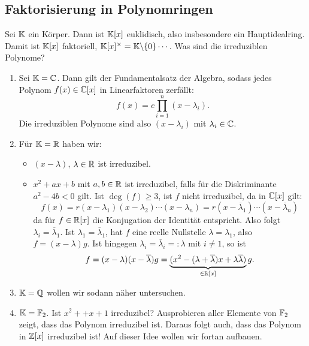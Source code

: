 \subsection{Faktorisierung in Polynomringen}
\label{sec:galois}

\begin{beispiele}
Sei $\mathbb{K}$ ein Körper. Dann ist $\mathbb{K}[x]$ euklidisch, also insbesondere ein Hauptidealring. Damit ist $\mathbb{K}[x]$ faktoriell, $\mathbb{K}[x]^\times = \mathbb{K} \backslash \{0\} \cdots$. Was sind die irreduziblen Polynome?
\begin{enumerate}
\item Sei $\mathbb{K} = \mathbb{C}$. Dann gilt der Fundamentalsatz der Algebra, sodass jedes Polynom $f(x) \in \mathbb{C}[x]$ in Linearfaktoren zerfällt:
\begin{equation}
f(x) = c \prod_{i=1}^n (x-\lambda_i).
\end{equation}
Die irreduziblen Polynome sind also $(x-\lambda_i)$ mit $\lambda_i \in \mathbb{C}$.
\item Für $\mathbb{K} = \mathbb{R}$ haben wir:
\begin{itemize}
\item $(x-\lambda)$, $\lambda \in \mathbb{R}$ ist irreduzibel.
\item $x^2+ax+b$ mit $a,b \in \mathbb{R}$ ist irreduzibel, falls für die Diskriminante $a^2-4b<0$ gilt. Ist $\deg(f)\geq 3$, ist $f$ nicht irreduzibel, da in $\mathbb{C}[x]$ gilt:
\begin{equation}
f(x) = r(x-\lambda_1)(x-\lambda_2) \cdots (x-\lambda_n)= r(x-\overline{\lambda}_1) \cdots (x -\overline{\lambda}_n)
\end{equation}
da für $f \in \mathbb{R}[x]$ die Konjugation der Identität entspricht. Also folgt $\lambda_i = \overline{\lambda}_1$. Ist $\lambda_1 = \overline{\lambda}_1$, hat $f$ eine reelle Nullstelle $\lambda = \lambda_1$, also $f=(x-\lambda)g$. Ist hingegen $\lambda_i = \overline{\lambda}_i =: \lambda$ mit $i \neq 1$, so ist 
\begin{equation}
f = (x-\lambda)(x-\overline{\lambda})g = \underbrace{(x^2 - (\lambda + \overline{\lambda})x + \lambda \overline{\lambda})}_{\in \mathbb{R}[x]}g.
\end{equation} 
\end{itemize}
\item $\mathbb{K} = \mathbb{Q}$ wollen wir sodann näher untersuchen.
\item $\mathbb{K} = \mathbb{F}_2$. Ist $x^2++x+1$ irreduzibel? Ausprobieren aller Elemente von $\mathbb{F}_2$ zeigt, dass das Polynom irreduzibel ist. Daraus folgt auch, dass das Polynom in $\mathbb{Z}[x]$ irreduzibel ist! Auf dieser Idee wollen wir fortan aufbauen.
\end{enumerate}
\end{beispiele}
